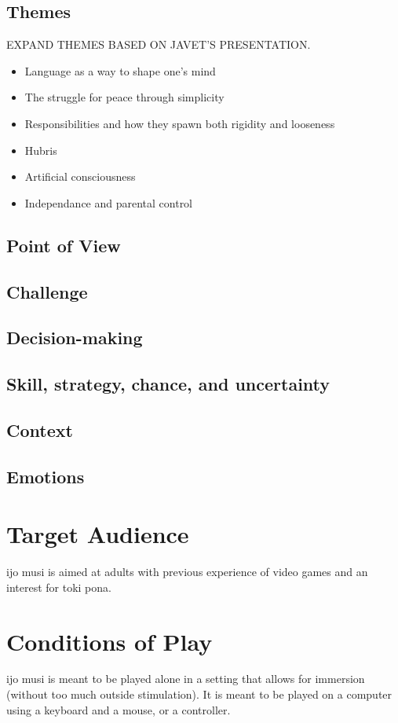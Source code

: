 \documentclass{scrartcl}
\begin{document}
		\subsection{Themes}
		EXPAND THEMES BASED ON JAVET'S PRESENTATION.
		\begin{itemize}
			\item Language as a way to shape one's mind
			\item The struggle for peace through simplicity
			\item Responsibilities and how they spawn both rigidity and looseness
			\item Hubris
			\item Artificial consciousness
			\item Independance and parental control
		\end{itemize}
		\subsection{Point of View}
		\subsection{Challenge}
		\subsection{Decision-making}
		\subsection{Skill, strategy, chance, and uncertainty}
		\subsection{Context}
		\subsection{Emotions}
	\section{Target Audience}
		ijo musi is aimed at adults with previous experience of video games and an interest for toki pona. 
	\section{Conditions of Play}
		ijo musi is meant to be played alone in a setting that allows for immersion (without too much outside stimulation). It is meant to be played on a computer using a keyboard and a mouse, or a controller. 
\end{document}
